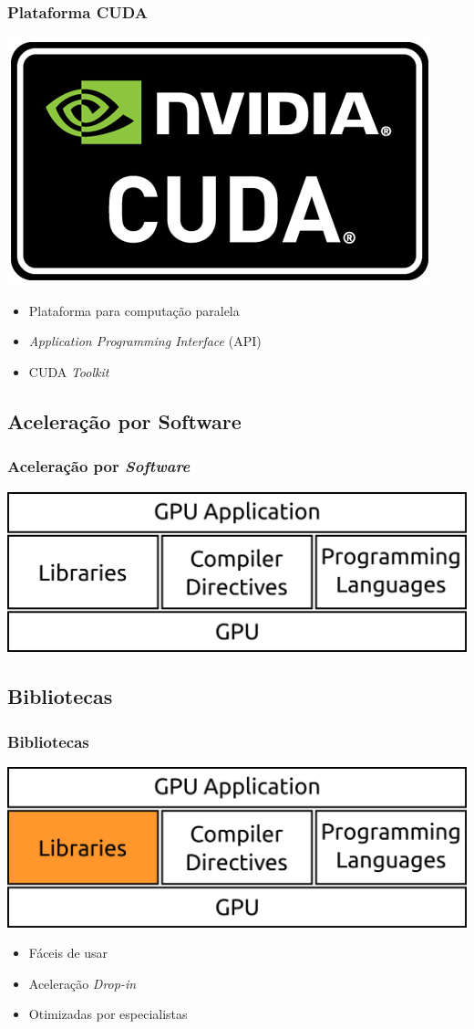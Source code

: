 \documentclass[10pt, compress]{beamer}
\begin{document}
\begin{frame}
    \frametitle{Plataforma CUDA}
    \begin{center}
        \includegraphics[width=.4\textwidth]{cuda-logo}
    \end{center}
    \begin{itemize}
        \item Plataforma para \alert{computação paralela}
        \item \textit{Application Programming Interface} (API)
        \item CUDA \textit{Toolkit}
    \end{itemize}
\end{frame}

\subsection{Aceleração por Software}

\begin{frame}
    \frametitle{Aceleração por \textit{Software}}
    \centering
    \includegraphics[width=.95\textwidth]{accel_apps}
\end{frame}

\subsection{Bibliotecas}

\begin{frame}
    \frametitle{Bibliotecas}
    \begin{center}
        \includegraphics[width=.6\textwidth]{accel_apps_lib}
    \end{center}
    \begin{itemize}
        \item Fáceis de usar
            \pause
        \item Aceleração \textit{Drop-in}
            \pause
        \item Otimizadas por especialistas
    \end{itemize}
\end{frame}
\end{document}
